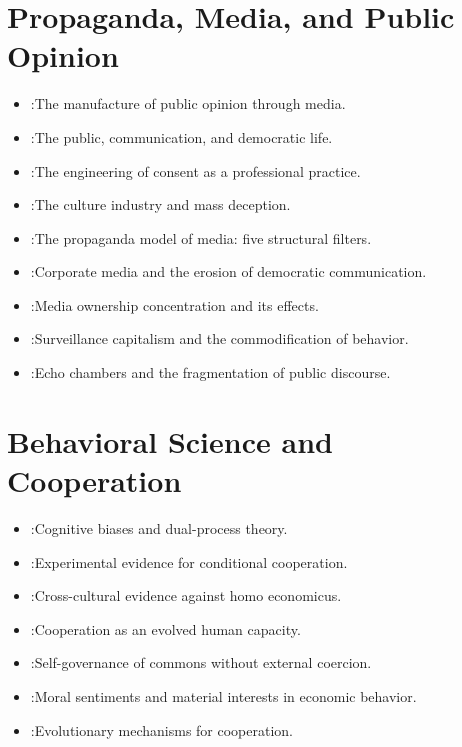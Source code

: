 \section*{Propaganda, Media, and Public Opinion}

\begin{itemize}[nosep]
  \item \textcite{lippmann1922}:The manufacture of public opinion through media.
  \item \textcite{dewey1927}:The public, communication, and democratic life.
  \item \textcite{bernays1928}:The engineering of consent as a professional practice.
  \item \textcite{adorno1944}:The culture industry and mass deception.
  \item \textcite{herman1988}:The propaganda model of media: five structural filters.
  \item \textcite{mcchesney1999}:Corporate media and the erosion of democratic communication.
  \item \textcite{bagdikian2004}:Media ownership concentration and its effects.
  \item \textcite{zuboff2019}:Surveillance capitalism and the commodification of behavior.
  \item \textcite{sunstein2017}:Echo chambers and the fragmentation of public discourse.
\end{itemize}

\section*{Behavioral Science and Cooperation}

\begin{itemize}[nosep]
  \item \textcite{kahneman2011}:Cognitive biases and dual-process theory.
  \item \textcite{fischbacher2001}:Experimental evidence for conditional cooperation.
  \item \textcite{henrich2001}:Cross-cultural evidence against homo economicus.
  \item \textcite{bowles2011}:Cooperation as an evolved human capacity.
  \item \textcite{ostrom1990}:Self-governance of commons without external coercion.
  \item \textcite{gintis2005}:Moral sentiments and material interests in economic behavior.
  \item \textcite{nowak2006}:Evolutionary mechanisms for cooperation.
\end{itemize}


